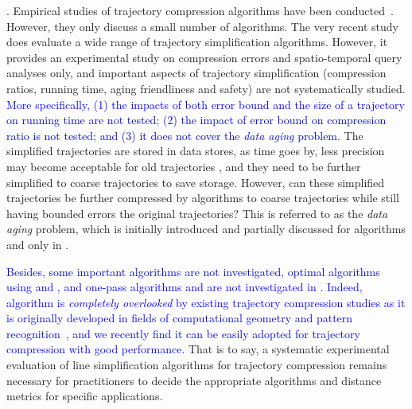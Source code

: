 {. Empirical studies of trajectory compression algorithms have been conducted~\cite{Muckell:Compression,MuckellHLR10}. However, they only discuss a small number of algorithms.
%
The very recent study \cite{Zhang:Evaluation} does evaluate a wide range of trajectory simplification algorithms.
However, it provides {an experimental study} on compression errors and spatio-temporal query analyses only, and important aspects of trajectory simplification (compression ratios, running time, aging friendliness and safety) are not systematically studied.
\textcolor{blue}{More specifically, }
\textcolor{blue}{(1) the impacts of both error bound and the size of a trajectory on running time are not tested;}
%
\textcolor{blue}{(2) the impact of error bound on compression ratio is not tested; and }
%
\textcolor{blue}{(3) it does not cover the \emph{data aging} problem.} The simplified trajectories are stored in data stores, as time goes by, less precision may become acceptable for old trajectories \cite{Cao:Spatio}, and they need to be further simplified to coarse trajectories to save storage. However, can these simplified trajectories be further compressed by \lsa algorithms to coarse trajectories while still having bounded errors \wrt the original trajectories? This is referred to as the \emph{data aging} problem, which is initially introduced and partially discussed for algorithms \opt and \dpa only in \cite{Cao:Spatio}.

\textcolor{blue}{Besides, some important algorithms are not investigated, \eg optimal algorithms using \ped and \sed, and one-pass algorithms \siped and \cised are not investigated in \cite{Zhang:Evaluation}. Indeed, algorithm \siped is {\em completely overlooked} by existing trajectory compression studies as it is originally developed in fields of computational geometry and pattern recognition~\cite{Williams:Longest,Sklansky:Cone,Dunham:Cone, Zhao:Sleeve}, and we recently find it can be easily adopted for trajectory compression with good performance.} %
%
That is to say, a systematic experimental evaluation of line simplification algorithms for trajectory compression remains necessary for practitioners to decide the appropriate algorithms and distance metrics for specific applications.





}
